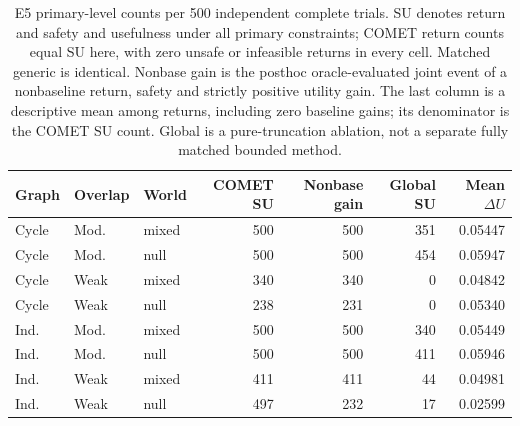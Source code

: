 \begin{table}[tbp]
\centering\small
\begin{tabular}{lllrrrr}
\toprule
Graph & Overlap & World & COMET SU & Nonbase gain & Global SU & Mean $\Delta U$\\
\midrule
Cycle & Mod. & mixed & 500 & 500 & 351 & 0.05447\\
Cycle & Mod. & null & 500 & 500 & 454 & 0.05947\\
Cycle & Weak & mixed & 340 & 340 & 0 & 0.04842\\
Cycle & Weak & null & 238 & 231 & 0 & 0.05340\\
Ind. & Mod. & mixed & 500 & 500 & 340 & 0.05449\\
Ind. & Mod. & null & 500 & 500 & 411 & 0.05946\\
Ind. & Weak & mixed & 411 & 411 & 44 & 0.04981\\
Ind. & Weak & null & 497 & 232 & 17 & 0.02599\\
\bottomrule
\end{tabular}
\caption{E5 primary-level counts per 500 independent complete trials. SU denotes return and safety and usefulness under all primary constraints; COMET return counts equal SU here, with zero unsafe or infeasible returns in every cell. Matched generic is identical. Nonbase gain is the posthoc oracle-evaluated joint event of a nonbaseline return, safety and strictly positive utility gain. The last column is a descriptive mean among returns, including zero baseline gains; its denominator is the COMET SU count. Global is a pure-truncation ablation, not a separate fully matched bounded method.}
\label{tab:post-E5}
\end{table}
